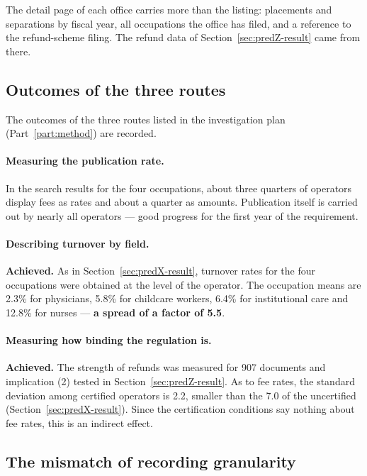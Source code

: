 The detail page of each office carries more than the listing: placements and separations by fiscal
year, all occupations the office has filed, and a reference to the refund-scheme filing. The
refund data of Section~\ref{sec:predZ-result} came from there.

\subsection{Outcomes of the three routes}

The outcomes of the three routes listed in the investigation plan (Part~\ref{part:method}) are
recorded.

\paragraph{Measuring the publication rate.}
In the search results for the four occupations, about three quarters of operators display fees as
rates and about a quarter as amounts. Publication itself is carried out by nearly all operators —
good progress for the first year of the requirement.

\paragraph{Describing turnover by field.}
\textbf{Achieved.} As in Section~\ref{sec:predX-result}, turnover rates for the four occupations
were obtained at the level of the operator. The occupation means are 2.3\% for physicians, 5.8\%
for childcare workers, 6.4\% for institutional care and 12.8\% for nurses — \textbf{a spread of a
factor of 5.5}.

\paragraph{Measuring how binding the regulation is.}
\textbf{Achieved.} The strength of refunds was measured for 907 documents and implication (2)
tested in Section~\ref{sec:predZ-result}. As to fee rates, the standard deviation among certified
operators is 2.2, smaller than the 7.0 of the uncertified (Section~\ref{sec:predX-result}). Since
the certification conditions say nothing about fee rates, this is an indirect effect.

\subsection{The mismatch of recording granularity}

